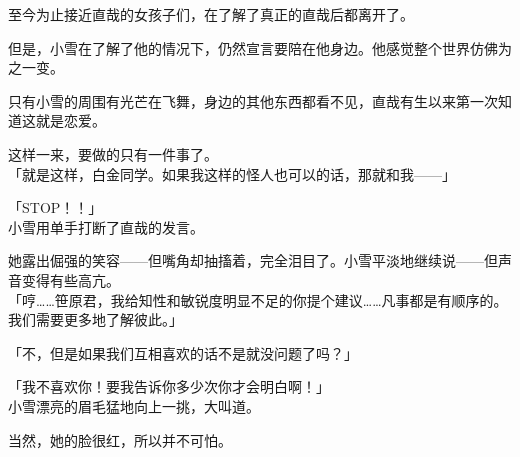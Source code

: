 至今为止接近直哉的女孩子们，在了解了真正的直哉后都离开了。

但是，小雪在了解了他的情况下，仍然宣言要陪在他身边。他感觉整个世界仿佛为之一变。

只有小雪的周围有光芒在飞舞，身边的其他东西都看不见，直哉有生以来第一次知道这就是恋爱。

这样一来，要做的只有一件事了。\\

「就是这样，白金同学。如果我这样的怪人也可以的话，那就和我——」

「STOP！！」\\

小雪用单手打断了直哉的发言。

她露出倔强的笑容——但嘴角却抽搐着，完全泪目了。小雪平淡地继续说——但声音变得有些高亢。\\

「哼……笹原君，我给知性和敏锐度明显不足的你提个建议……凡事都是有顺序的。我们需要更多地了解彼此。」

「不，但是如果我们互相喜欢的话不是就没问题了吗？」

「我不喜欢你！要我告诉你多少次你才会明白啊！」\\

小雪漂亮的眉毛猛地向上一挑，大叫道。

当然，她的脸很红，所以并不可怕。\\

